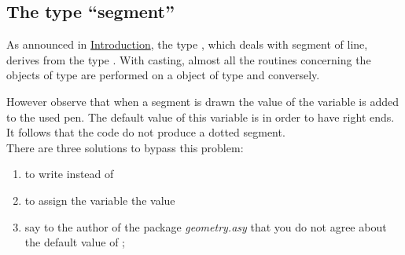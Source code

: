 \documentclass[pdftex]{article}
\newcommand{\geo}{the package \emph{geometry.asy}\xspace}
\begin{document}
\subsection{The type \texorpdfstring{``segment''}{segment}}
As announced  in \href{#section.intro}{Introduction}, the type
, which deals with segment of line, derives from the
type . With casting, almost all the routines
concerning the objects of type  are performed on a object
of type  and conversely.

However observe that when a segment is drawn the value of the variable
 is added to the used pen. The default value of this
variable is  in order to have right ends. It follows
that the code  do not produce a
dotted segment.\\
There are three solutions to bypass this problem:
\begin{enumerate}
\item to write  instead of
\item to assign the variable  the value 
\item say to the author of \geo that you do not agree about the
  default value of ;
\end{enumerate}
\end{document}
